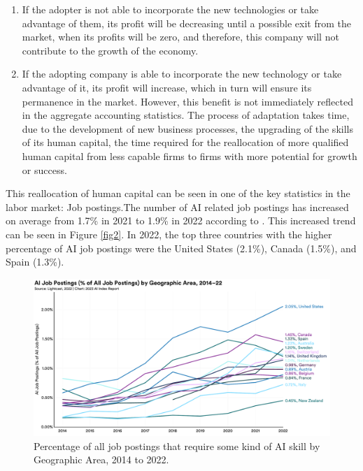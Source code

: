 \documentclass[preprint, 1p,
authoryear]{elsarticle} %
\begin{document}
\begin{enumerate}
\def\labelenumi{\arabic{enumi}.}
\item
  If the adopter is not able to incorporate the new technologies or take
  advantage of them, its profit will be decreasing until a possible exit
  from the market, when its profits will be zero, and therefore, this
  company will not contribute to the growth of the economy.
\item
  If the adopting company is able to incorporate the new technology or
  take advantage of it, its profit will increase, which in turn will
  ensure its permanence in the market. However, this benefit is not
  immediately reflected in the aggregate accounting statistics. The
  process of adaptation takes time, due to the development of new
  business processes, the upgrading of the skills of its human capital,
  the time required for the reallocation of more qualified human capital
  from less capable firms to firms with more potential for growth or
  success.
\end{enumerate}

This reallocation of human capital can be seen in one of the key
statistics in the labor market: Job postings.The number of AI related
job postings has increased on average from 1.7\% in 2021 to 1.9\% in
2022 according to \citep{reportAI}. This increased trend can be seen in
Figure \ref{fig2}. In 2022, the top three countries with the higher
percentage of AI job postings were the United States (2.1\%), Canada
(1.5\%), and Spain (1.3\%).

\begin{figure}

{\centering \includegraphics[width=0.7\linewidth]{../Views/AI_job_postings_by_geo_area} 

}

\caption{\label{fig2} Percentage of all job postings that require some kind of AI skill by Geographic Area, 2014 to 2022.}\label{fig:fig2}
\end{figure}
\end{document}
